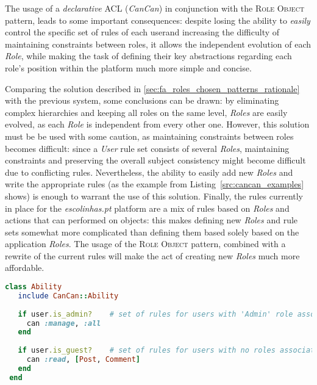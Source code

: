 The usage of a \emph{declarative} ACL (\emph{CanCan}) in conjunction with the \textsc{Role Object} pattern, leads to some important consequences: despite losing the ability to \emph{easily} control the specific set of rules of each user\footnotemark and increasing the difficulty of maintaining constraints between roles, it allows the independent evolution of each \emph{Role}, while making the task of defining their key abstractions regarding each role's position within the platform much more simple and concise.

Comparing the solution described in \ref{sec:fa_roles_chosen_patterns_rationale} with the previous system, some conclusions can be drawn: by eliminating complex hierarchies and keeping all roles on the same level, \emph{Roles} are easily evolved, as each \emph{Role} is independent from every other one. However, this solution must be be used with some caution, as maintaining constraints between roles becomes difficult: since a \emph{User} rule set consists of several \emph{Roles}, maintaining constraints and preserving the overall subject consistency might become difficult due to conflicting rules. Nevertheless, the ability to easily add new \emph{Roles} and write the appropriate rules (as the example from Listing~\ref{src:cancan_examples} shows) is enough to warrant the use of this solution. Finally, the rules currently in place for the \emph{escolinhas.pt} platform are a mix of rules based on \emph{Roles} and actions that can performed on objects: this makes defining new \emph{Roles} and rule sets somewhat more complicated than defining them based solely based on the application \emph{Roles}. The usage of the \textsc{Role Object} pattern, combined with a rewrite of the current rules will make the act of creating new \emph{Roles} much more affordable.

\begin{lstlisting}[language=ruby, float=htb, label=src:cancan_examples, caption=CanCan rule definition example.]
 class Ability
   include CanCan::Ability
 
   if user.is_admin?    # set of rules for users with 'Admin' role associated
     can :manage, :all
   end
   
   if user.is_guest?    # set of rules for users with no roles associated
     can :read, [Post, Comment]
   end
 end
\end{lstlisting}



